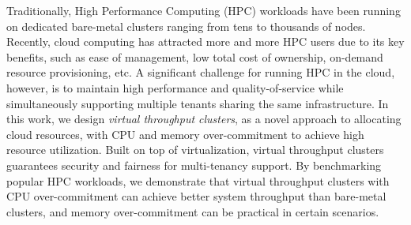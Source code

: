Traditionally, High Performance Computing (HPC) workloads have been running on dedicated bare-metal clusters ranging from tens to thousands of nodes. Recently, cloud computing has attracted more and more HPC users due to its key benefits, such as ease of management, low total cost of ownership, on-demand resource provisioning, etc. A significant challenge for running HPC in the cloud, however, is to maintain high performance and quality-of-service while simultaneously supporting multiple tenants sharing the same infrastructure. In this work, 
we design \textit{virtual throughput clusters}, as a novel approach to allocating cloud resources, with CPU and memory over-commitment to achieve high resource utilization. 
Built on top of virtualization, virtual throughput clusters guarantees security and fairness for multi-tenancy support. 
By benchmarking popular HPC workloads, we demonstrate that virtual throughput clusters with CPU over-commitment can achieve better system throughput than bare-metal clusters, and memory over-commitment can be practical in certain scenarios. 
